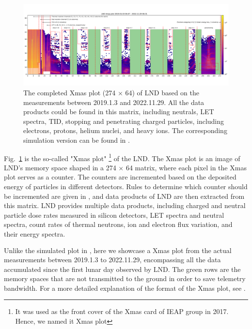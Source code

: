 \begin{figure}
    \centering
    \includegraphics[width =0.95\textheight, height = 0.4\textheight, angle = 90]{images/xmas-2019-01-03To2022-11-29.png}
    \caption[\ac{LND} Xmas plot from measurements]{The completed Xmas plot (274 $\times$ 64) of \ac{LND} based on the measurements between 2019.1.3 and 2022.11.29. All the data products could be found in this matrix, including neutrals, \ac{LET} spectra, \ac{TID}, stopping and penetrating charged particles, including electrons, protons, helium nuclei, and heavy ions. The corresponding simulation version can be found in \citet{Wimmer2020SSRv}.}
    \label{Fig:measurement_Xmas}
\end{figure}

Fig.~\ref{Fig:measurement_Xmas} is the so-called "Xmas plot" \footnote{It was used as the front cover of the Xmas card of IEAP group in 2017. Hence, we named it Xmas plot} of the \ac{LND}. The Xmas plot is an image of \ac{LND}'s memory space shaped in a 274 $\times$ 64 matrix, where each pixel in the Xmas plot serves as a counter. The counters are incremented based on the deposited energy of particles in different detectors. Rules to determine which counter should be incremented are given in \citet{Wimmer2020SSRv}, and data products of \ac{LND} are then extracted from this matrix. 
\ac{LND} provides multiple data products, including charged and neutral particle dose rates measured in silicon detectors, \ac{LET} spectra and neutral spectra, count rates of thermal neutrons, ion and electron flux variation, and their energy spectra.
 
Unlike the simulated plot in \citet{Wimmer2020SSRv}, here we showcase a Xmas plot from the actual measurements between 2019.1.3 to 2022.11.29, encompassing all the data accumulated since the first lunar day observed by \ac{LND}. The green rows are the memory spaces that are not transmitted to the ground in order to save telemetry bandwidth. 
For a more detailed explanation of the format of the Xmas plot, see \citet{Wimmer2020SSRv}.

